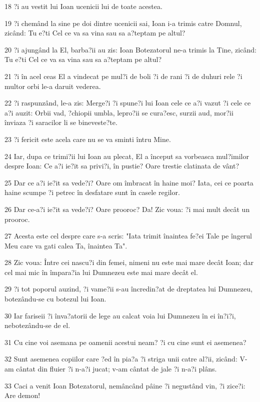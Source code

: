 \par 18 ?i au vestit lui Ioan ucenicii lui de toate acestea.
\par 19 ?i chemând la sine pe doi dintre ucenicii sai, Ioan i-a trimis catre Domnul, zicând: Tu e?ti Cel ce va sa vina sau sa a?teptam pe altul?
\par 20 ?i ajungând la El, barba?ii au zis: Ioan Botezatorul ne-a trimis la Tine, zicând: Tu e?ti Cel ce va sa vina sau sa a?teptam pe altul?
\par 21 ?i în acel ceas El a vindecat pe mul?i de boli ?i de rani ?i de duhuri rele ?i multor orbi le-a daruit vederea.
\par 22 ?i raspunzând, le-a zis: Merge?i ?i spune?i lui Ioan cele ce a?i vazut ?i cele ce a?i auzit: Orbii vad, ?chiopii umbla, lepro?ii se cura?esc, surzii aud, mor?ii înviaza ?i saracilor li se bineveste?te.
\par 23 ?i fericit este acela care nu se va sminti întru Mine.
\par 24 Iar, dupa ce trimi?ii lui Ioan au plecat, El a început sa vorbeasca mul?imilor despre Ioan: Ce a?i ie?it sa privi?i, în pustie? Oare trestie clatinata de vânt?
\par 25 Dar ce a?i ie?it sa vede?i? Oare om îmbracat în haine moi? Iata, cei ce poarta haine scumpe ?i petrec în desfatare sunt în casele regilor.
\par 26 Dar ce-a?i ie?it sa vede?i? Oare prooroc? Da! Zic voua: ?i mai mult decât un prooroc.
\par 27 Acesta este cel despre care s-a scris: "Iata trimit înaintea fe?ei Tale pe îngerul Meu care va gati calea Ta, înaintea Ta".
\par 28 Zic voua: Între cei nascu?i din femei, nimeni nu este mai mare decât Ioan; dar cel mai mic în împara?ia lui Dumnezeu este mai mare decât el.
\par 29 ?i tot poporul auzind, ?i vame?ii s-au încredin?at de dreptatea lui Dumnezeu, botezându-se cu botezul lui Ioan.
\par 30 Iar fariseii ?i înva?atorii de lege au calcat voia lui Dumnezeu în ei în?i?i, nebotezându-se de el.
\par 31 Cu cine voi asemana pe oamenii acestui neam? ?i cu cine sunt ei asemenea?
\par 32 Sunt asemenea copiilor care ?ed în pia?a ?i striga unii catre al?ii, zicând: V-am cântat din fluier ?i n-a?i jucat; v-am cântat de jale ?i n-a?i plâns.
\par 33 Caci a venit Ioan Botezatorul, nemâncând pâine ?i negustând vin, ?i zice?i: Are demon!
